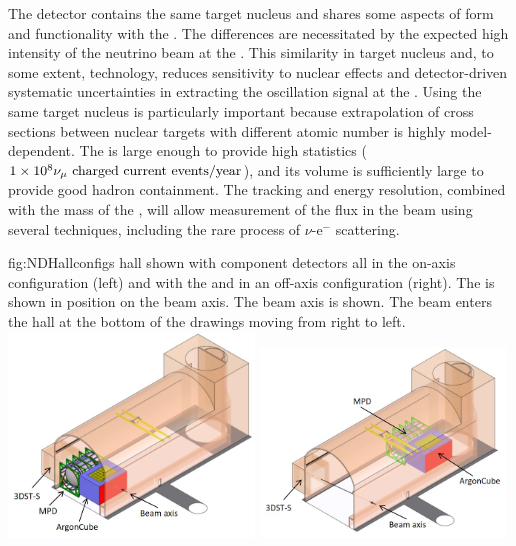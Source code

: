 The  detector contains the same target nucleus and shares some aspects of form and functionality with the . The differences are necessitated by the expected high intensity of the neutrino beam at the .  This similarity in target nucleus and, to some extent, technology, reduces sensitivity to nuclear effects and detector-driven systematic uncertainties in extracting the oscillation signal at the  . Using the same target nucleus is particularly important because extrapolation of cross sections between nuclear targets with different atomic number is highly model-dependent. The  is large enough to provide high statistics ($\num{1e8}{\numu \text{ charged current events/year}}$), and its volume is sufficiently large to provide good hadron containment.  The tracking and energy resolution, combined with the mass of the , will allow measurement of the flux in the beam using several techniques, including the rare process of $\nu$-e$^{-}$ scattering.

\begin{dunefigure}
{fig:NDHallconfigs}
{  hall shown with component detectors all in the on-axis configuration (left) and with the  and  in an off-axis configuration (right). The  is shown in position on the beam axis. The beam axis is shown.  The beam enters the hall at the bottom of the drawings moving from right to left.}
\includegraphics[width=0.49\textwidth]{graphics/NDHall_onaxis.jpg}
\includegraphics[width=0.49\textwidth]{graphics/NDHall_offaxis.jpg}
\end{dunefigure}

